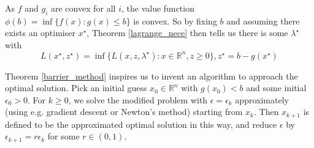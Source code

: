 \begin{remark}
    As $f$ and $g_i$ are convex for all $i$, the value function $\phi(b)=\inf\{f(x):g(x)\le b\}$ is convex.
    So by fixing $b$ and assuming there exists an optimiser $x^\star$, Theorem \ref{lagrange_nece} then tells us there is some $\lambda^\star$ with
    $$L(x^\star,z^\star)=\inf\{L(x,z,\lambda^\star):x\in\mathbb R^n,z\ge 0\},z^\star=b-g(x^\star)$$
\end{remark}
Theorem \ref{barrier_method} inspires us to invent an algorithm to approach the optimal solution.
Pick an initial guess $x_0\in\mathbb R^n$ with $g(x_0)<b$ and some initial $\epsilon_0>0$.
For $k\ge 0$, we solve the modified problem with $\epsilon=\epsilon_k$ approximately (using e.g. gradient descent or Newton's method) starting from $x_k$.
Then $x_{k+1}$ is defined to be the approximated optimal solution in this way, and reduce $\epsilon$ by $\epsilon_{k+1}=r\epsilon_k$ for some $r\in (0,1)$.